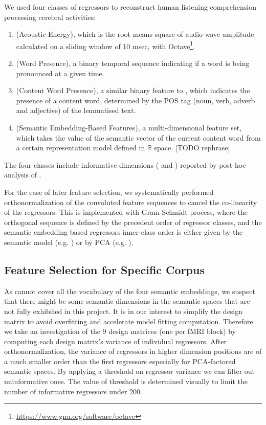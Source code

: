 We used four classes of regressors to reconstruct human listening comprehension processing cerebral activities:
\begin{enumerate}
	\item {} (Acoustic Energy), which is the root means square of audio wave amplitude calculated on a sliding window of 10 msec, with Octave\footnote{\url{https://www.gnu.org/software/octave}}.
	\item {} (Word Presence), a binary temporal sequence indicating if a word is being pronounced at a given time.
	\item {} (Content Word Presence), a similar binary feature to , which indicates the presence of a content word, determined by the POS tag (noun, verb, adverb and adjective) of the lemmatised text.
	\item {} (Semantic Embedding-Based Features), a multi-dimensional feature set, which takes the value of the semantic vector of the current content word from a certain representation model defined in \(\mathbb{R}\) space. [TODO rephrase]
\end{enumerate}
The four classes include informative dimensions ( and ) reported by post-hoc analysis of \cite{todorovicAnalysesIRMfLors2018}. 

For the ease of later feature selection, we systematically performed orthonormalization of the convoluted feature sequences to cancel the co-linearity of the regressors. This is implemented with Gram-Schmidt process, where the orthogonal sequence is defined by the precedent order of regressor classes, and the semantic embedding based regressors inner-class order is either given by the semantic model (e.g. ) or by PCA (e.g. ). 


\subsection{Feature Selection for Specific Corpus}

As \cite{saint-exuperyPetitPrince1943} cannot cover all the vocabulary of the four semantic embeddings, we suspect that there might be some semantic dimensions in the semantic spaces that are not fully exhibited in this project. It is in our interest to simplify the design matrix to avoid overfitting and accelerate model fitting computation. Therefore we take an investigation of the 9 design matrices (one per fMRI block) by computing each design matrix's variance of individual regressors. After orthonormalization, the variance of regressors in higher dimension positions are of a much smaller order than the first regressors especially for PCA-factored semantic spaces. By applying a threshold on regressor variance we can filter out uninformative ones. The value of threshold is determined visually to limit the number of informative regressors under 200.


